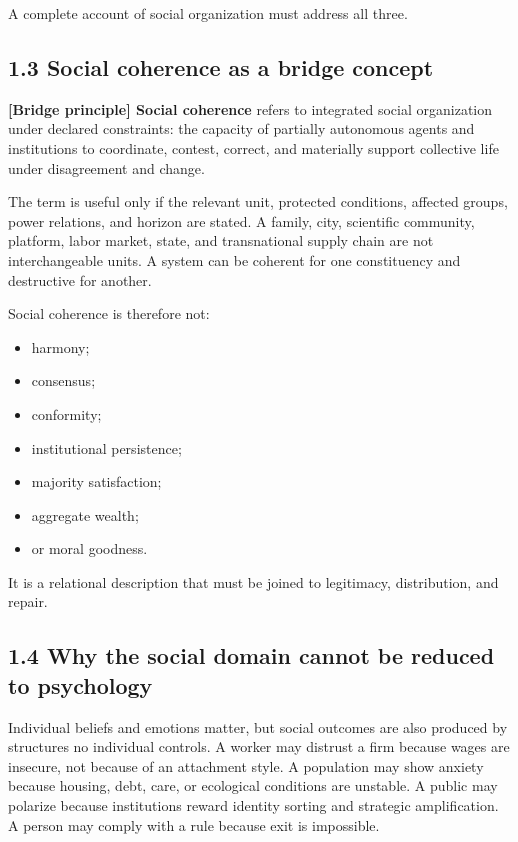 \documentclass[
  11pt,
]{article}
\providecommand{\tightlist}{%
  \setlength{\itemsep}{0pt}\setlength{\parskip}{0pt}}
\begin{document}
A complete account of social organization must address all three.

\subsection{1.3 Social coherence as a bridge
concept}\label{social-coherence-as-a-bridge-concept}

\textbf{{[}Bridge principle{]} Social coherence} refers to integrated
social organization under declared constraints: the capacity of
partially autonomous agents and institutions to coordinate, contest,
correct, and materially support collective life under disagreement and
change.

The term is useful only if the relevant unit, protected conditions,
affected groups, power relations, and horizon are stated. A family,
city, scientific community, platform, labor market, state, and
transnational supply chain are not interchangeable units. A system can
be coherent for one constituency and destructive for another.

Social coherence is therefore not:

\begin{itemize}
\tightlist
\item
  harmony;
\item
  consensus;
\item
  conformity;
\item
  institutional persistence;
\item
  majority satisfaction;
\item
  aggregate wealth;
\item
  or moral goodness.
\end{itemize}

It is a relational description that must be joined to legitimacy,
distribution, and repair.

\subsection{1.4 Why the social domain cannot be reduced to
psychology}\label{why-the-social-domain-cannot-be-reduced-to-psychology}

Individual beliefs and emotions matter, but social outcomes are also
produced by structures no individual controls. A worker may distrust a
firm because wages are insecure, not because of an attachment style. A
population may show anxiety because housing, debt, care, or ecological
conditions are unstable. A public may polarize because institutions
reward identity sorting and strategic amplification. A person may comply
with a rule because exit is impossible.
\end{document}

